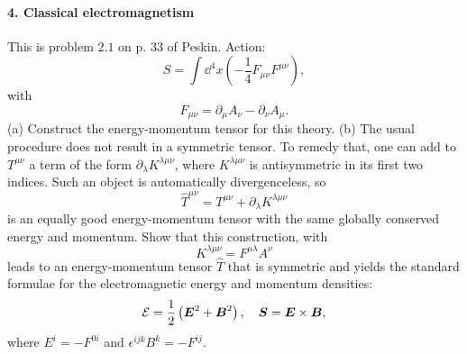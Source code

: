 \documentclass[hyperref, a4paper]{article}
\begin{document}
\paragraph{4. Classical electromagnetism} This is problem $2.1$ on p. 33 of Peskin.
Action: 
\begin{equation}
    S=\int \dd^{4} x\left(-\frac{1}{4} F_{\mu \nu} F^{\mu \nu}\right),
\end{equation}
with 
\begin{equation}
    F_{\mu \nu}=\partial_{\mu} A_{\nu}-\partial_{\nu} A_{\mu}.
\end{equation}
(a) Construct the energy-momentum tensor for this theory.
(b) The usual procedure does not result in a symmetric tensor. To remedy that, one can add to $T^{\mu \nu}$ a term of the form $\partial_{\lambda} K^{\lambda \mu \nu}$, where $K^{\lambda \mu \nu}$ is antisymmetric in its first two indices. Such an object is automatically divergenceless, so
\begin{equation}
    \hat{T}^{\mu \nu}=T^{\mu \nu}+\partial_{\lambda} K^{\lambda \mu \nu}
    \label{eq:peskin-2-1-3}
\end{equation}
is an equally good energy-momentum tensor with the same globally conserved energy and momentum. Show that this construction, with
\begin{equation}
    K^{\lambda \mu \nu}=F^{\mu \lambda} A^{\nu}
    \label{eq:peskin-2-1-4}
\end{equation}
leads to an energy-momentum tensor $\hat{T}$ that is symmetric and yields the standard formulae for the electromagnetic energy and momentum densities:
\begin{equation}
    \mathcal{E}=\frac{1}{2}\left({\vb*{E}}^{2}+\vb*{B}^{2}\right) , \quad \vb*{S}=\vb*{E} \times \vb*{B},
    \label{eq:peskin-2-1-5}
\end{equation}
where $E^{i}=-F^{0 i}$ and $\epsilon^{i j k} B^{k}=-F^{i j}$.
\end{document}
